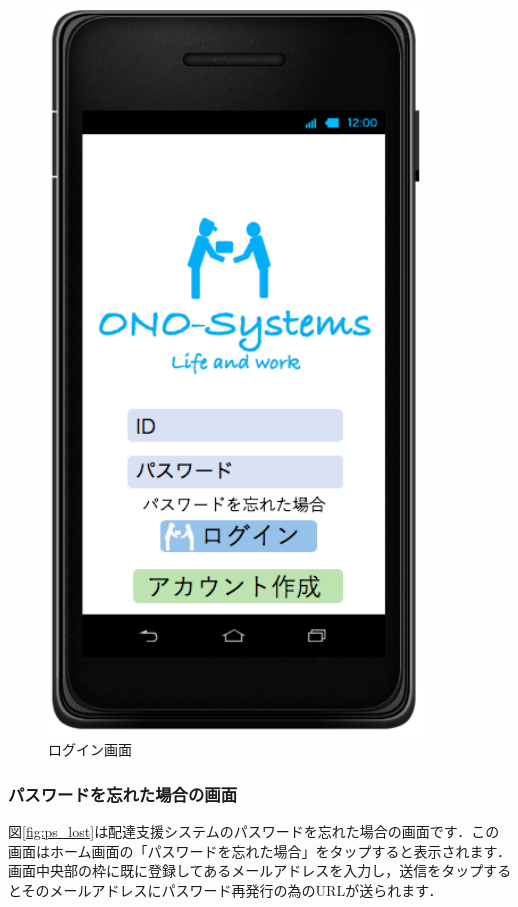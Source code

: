 \documentclass[a4j,titlepage]{jarticle}
\begin{document}
\begin{figure}[H]
 \begin{center}
  \includegraphics[width=100mm]{login.png}
	\caption{ログイン画面}
	\label{fig:login}
 \end{center}

\end{figure}

\newpage
\subsubsection{パスワードを忘れた場合の画面}
図\ref{fig:ps_lost}は配達支援システムのパスワードを忘れた場合の画面です．この画面はホーム画面の「パスワードを忘れた場合」をタップすると表示されます．画面中央部の枠に既に登録してあるメールアドレスを入力し，送信をタップするとそのメールアドレスにパスワード再発行の為のURLが送られます．
\end{document}
